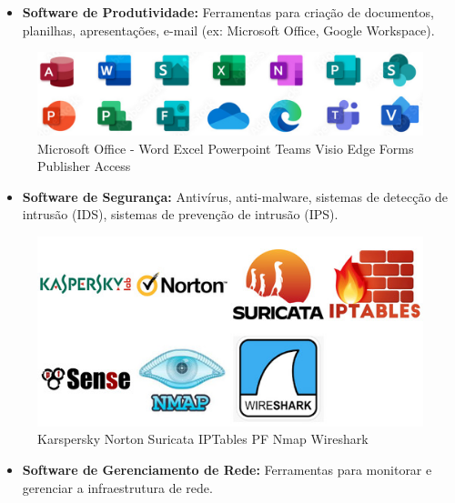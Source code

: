 \documentclass[
]{book}
\providecommand{\tightlist}{%
  \setlength{\itemsep}{0pt}\setlength{\parskip}{0pt}}
\begin{document}
\begin{itemize}
\tightlist
\item
  \textbf{Software de Produtividade:} Ferramentas para criação de documentos, planilhas, apresentações, e-mail (ex: Microsoft Office, Google Workspace).
\end{itemize}

\begin{figure}
\centering
\includegraphics{images/InfraEstrutura/software/MS-Office.jpg}
\caption{Microsoft Office - Word Excel Powerpoint Teams Visio Edge Forms Publisher Access}
\end{figure}

\begin{itemize}
\tightlist
\item
  \textbf{Software de Segurança:} Antivírus, anti-malware, sistemas de detecção de intrusão (IDS), sistemas de prevenção de intrusão (IPS).
\end{itemize}

\begin{figure}
\centering
\includegraphics{images/InfraEstrutura/software/seguranca.jpg}
\caption{Karspersky Norton Suricata IPTables PF Nmap Wireshark}
\end{figure}

\begin{itemize}
\tightlist
\item
  \textbf{Software de Gerenciamento de Rede:} Ferramentas para monitorar e gerenciar a infraestrutura de rede.
\end{itemize}
\end{document}
